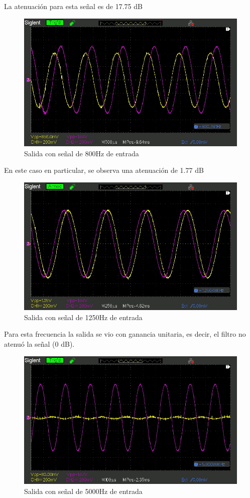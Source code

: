 La atenuación para esta señal es de 17.75 dB

\begin{figure}[H]
    \centering
    \includegraphics[width=0.75\linewidth]{figuras/SDS00034.jpg}
    \caption{Salida con señal de 800Hz de entrada}
    \label{fig:enter-label}
\end{figure}

En este caso en particular, se observa una atenuación de 1.77 dB

\begin{figure}[H]
    \centering
    \includegraphics[width=0.75\linewidth]{figuras/SDS00035.jpg}
    \caption{Salida con señal de 1250Hz de entrada}
    \label{fig:enter-label}
\end{figure}

Para esta frecuencia la salida se vio con ganancia unitaria, es decir, el filtro no atenuó la señal (0 dB).

\begin{figure}[H]
    \centering
    \includegraphics[width=0.75\linewidth]{figuras/SDS00036.jpg}
    \caption{Salida con señal de 5000Hz de entrada}
    \label{fig:enter-label}
\end{figure}

